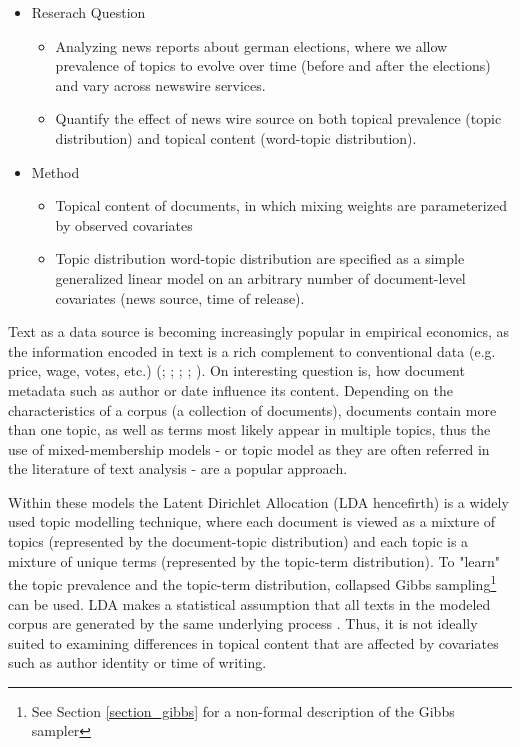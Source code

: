 \documentclass[12pt,a4paper,notitlepage]{article}
\begin{document}
\begin{itemize}
	\item Reserach Question
	\begin{itemize}
		\item Analyzing news reports about german elections, where we allow prevalence of topics to evolve over time (before and after the elections) and vary across newswire services.
		\item Quantify the effect of news wire source on both topical prevalence (topic distribution) and topical content (word-topic distribution).
	\end{itemize}
	\item Method
	\begin{itemize}
		\item Topical content of documents, in which mixing weights are parameterized by observed covariates
		\item Topic distribution word-topic distribution are specified as a simple generalized linear model on an arbitrary number of document-level covariates (news source, time of release).
	\end{itemize}
\end{itemize}


Text as a data source is becoming increasingly popular in empirical economics, as the information encoded in text is a rich complement to conventional data (e.g. price, wage, votes, etc.) (\citet{grimmer_bayesian_2010}; \citet{grimmer_text_2013}; \citet{quinn_how_2010}; \citet{gentzkow_text_2017}; \citet{roberts_model_2016}). On interesting question is, how document metadata such as author or date influence its content. Depending on the characteristics of a corpus (a collection of documents), documents contain more than one topic, as well as terms most likely appear in multiple topics, thus the use of mixed-membership models \citep{airoldi_handbook_2014} - or topic model as they are often referred in the literature of text analysis \citep{blei_probabilistic_2012} - are a popular approach. 

Within these models the Latent Dirichlet Allocation (LDA hencefirth) is a widely used topic modelling technique, where each document is viewed as a mixture of topics (represented by the document-topic distribution) and each topic is a mixture of unique terms (represented by the topic-term distribution). To "learn" the topic prevalence and the topic-term distribution, collapsed Gibbs sampling\footnote{See Section \ref{section_gibbs} for a non-formal description of the Gibbs sampler} can be used. LDA makes a statistical assumption that all texts in the modeled corpus are generated by the same underlying process \citep{blei_latent_2003}. Thus, it is not ideally suited to examining differences in topical content that are affected by covariates such as author identity or time of writing.
\end{document}
